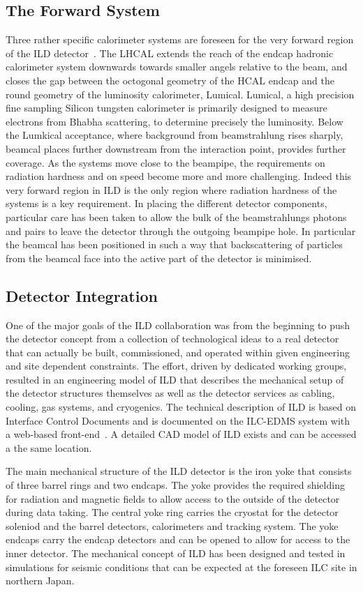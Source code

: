 \documentclass[%
 amsmath,amssymb,
 aps,
]{revtex4-1}
\begin{document}
\subsection{The Forward System}
Three rather specific calorimeter systems are foreseen for the very forward region of the ILD detector~\cite{Abramowicz:2010bg}. The LHCAL extends the reach of the endcap hadronic calorimeter system downwards towards smaller angels relative to the beam, and closes the gap between the octogonal geometry of the HCAL endcap and the round geometry of the luminosity calorimeter, Lumical. Lumical, a high precision fine sampling Silicon tungsten calorimeter is primarily designed to measure electrons from Bhabha scattering, to determine precisely the luminosity. Below the Lumkical acceptance, where background from beamstrahlung rises sharply, beamcal places further downstream from the interaction point, provides further coverage. As the systems move close to the beampipe, the requirements on radiation hardness and on speed become more and more challenging. Indeed this very forward region in ILD is the only region where radiation hardness of the systems is a key requirement. In placing the different detector components, particular care has been taken to allow the bulk of the beamstrahlungs photons and pairs to leave the detector through the outgoing beampipe hole. In particular the beamcal has been positioned in such a way that backscattering of particles from the beamcal face into the active part of the detector is minimised.

\subsection{Detector Integration}
One of the major goals of the ILD collaboration was from the beginning to push the detector concept from a collection of technological ideas to a real detector that can actually be built, commissioned, and operated within given engineering and site dependent constraints. The effort, driven by dedicated working groups, resulted in an engineering model of ILD that describes the mechanical setup of the detector structures themselves as well as the detector services as cabling, cooling, gas systems, and cryogenics. The technical description of ILD is based on Interface Control Documents and is documented on the ILC-EDMS system with a web-based front-end~\cite{EDMS}. A detailed CAD model of ILD exists and can be accessed a the same location.

The main mechanical structure of the ILD detector is the iron yoke that consists of three barrel rings and two endcaps. The yoke provides the required shielding for radiation and magnetic fields to allow access to the outside of the detector during data taking. The central yoke ring carries the cryostat for the detector soleniod and the barrel detectors, calorimeters and tracking system. The yoke endcaps carry the endcap detectors and can be opened to allow for access to the inner detector. The mechanical concept of ILD has been designed and tested in simulations for seismic conditions that can be expected at the foreseen ILC site in northern Japan.
\end{document}
